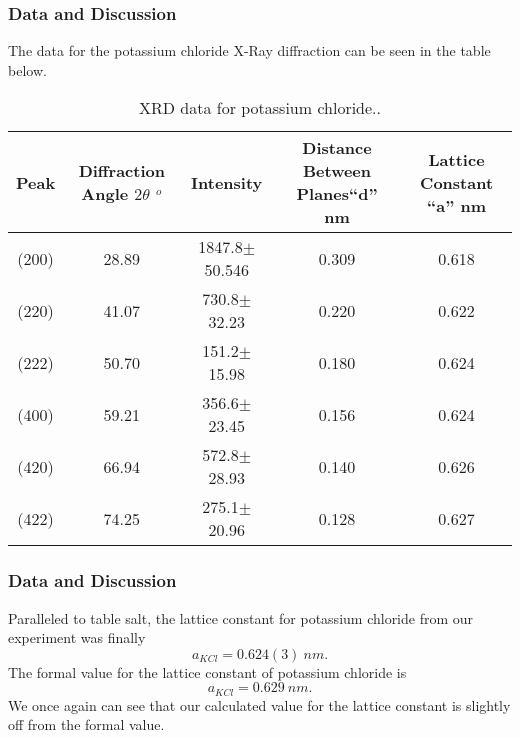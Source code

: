 \documentclass{beamer}
\begin{document}
\begin{frame}
\frametitle{Data and Discussion}
The data for the potassium chloride X-Ray diffraction can be seen in the table below.
\begin{table}[htp]
\begin{center}
\begin{tabular}{|c|c|c|c|c|}
\hline \textbf{\tiny{Peak}} & \textbf{\tiny{Diffraction Angle $2\theta$ $^{o}$}} & \textbf{\tiny{Intensity}} & \textbf{\tiny{Distance Between Planes``d'' nm}} & \textbf{\tiny{Lattice Constant ``a'' nm}} \\ \hline
\tiny{(200)} & \tiny{28.89} & \tiny{1847.8$\pm$50.546} & \tiny{0.309} & \tiny{0.618} \\ \hline
\tiny{(220)} & \tiny{41.07} & \tiny{730.8$\pm$32.23} & \tiny{0.220} & \tiny{0.622} \\ \hline
\tiny{(222)} & \tiny{50.70} & \tiny{151.2$\pm$15.98} & \tiny{0.180} & \tiny{0.624} \\ \hline
\tiny{(400)} & \tiny{59.21} & \tiny{356.6$\pm$23.45} & \tiny{0.156} & \tiny{0.624} \\ \hline
\tiny{(420)} & \tiny{66.94} & \tiny{572.8$\pm$28.93} & \tiny{0.140} & \tiny{0.626} \\ \hline
\tiny{(422)} & \tiny{74.25} & \tiny{275.1$\pm$20.96} & \tiny{0.128} & \tiny{0.627} \\ \hline
\end{tabular}
\caption{XRD data for potassium chloride..}
\end{center}
\label{default}
\end{table}%
\end{frame}


\begin{frame}
\frametitle{Data and Discussion}
Paralleled to table salt, the lattice constant for potassium chloride from our experiment was finally
\begin{equation}\label{5}
a_{KCl}=0.624(3) \ nm.
\end{equation}
The formal value for the lattice constant of potassium chloride is \cite{LatticeWiki}
\begin{equation}
a_{KCl}=0.629 \ nm.
\end{equation}
We once again can see that our calculated value for the lattice constant is slightly off from the formal value.
\end{frame}
\end{document}

